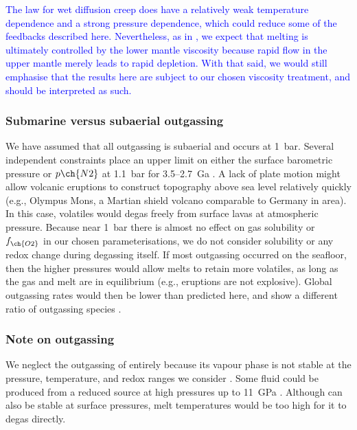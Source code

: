 \documentclass[3p,authoryear]{elsarticle}
\newcommand{\editthree}[2]{\textcolor{blue}{\sout{#1}#2}}
\begin{document}
\editthree{}{The \citet{Karato1993} law for wet diffusion creep does have a relatively weak temperature dependence and a strong pressure dependence, which could reduce some of the feedbacks described here. Nevertheless, as in \citet{dorn2018outgassing}, we expect that melting is ultimately controlled by the lower mantle viscosity because rapid flow in the upper mantle merely leads to rapid depletion. With that said, we would still emphasise that the results here are subject to our chosen viscosity treatment, and should be interpreted as such.}


\subsubsection{Submarine versus subaerial outgassing}

We have assumed that all outgassing is subaerial and occurs at 1~bar. Several independent constraints place an upper limit on either the surface barometric pressure or $p\ch{N2}$ at 1.1~bar for 3.5--2.7~Ga \citep{Marty2013, Catling2020}. A lack of plate motion might allow volcanic eruptions to construct topography above sea level relatively quickly (e.g., Olympus Mons, a Martian shield volcano comparable to Germany in area). In this case, volatiles would degas freely from surface lavas at atmospheric pressure. Because near 1~bar there is almost no effect on gas solubility or $f_{\ch{O2}}$ in our chosen parameterisations, we do not consider solubility or any redox change during degassing itself. If most outgassing occurred on the seafloor, then the higher pressures would allow melts to retain more volatiles, as long as the gas and melt are in equilibrium (e.g., eruptions are not explosive). Global outgassing rates would then be lower than predicted here, and show a different ratio of outgassing species \citep{Gaillard2011}.


\subsubsection{Note on  outgassing}

We neglect the outgassing of  entirely because its vapour phase is not stable at the pressure, temperature, and redox ranges we consider \citep{zhang2009model, wetzel2013degassing, ramirez2014warming}. Some  fluid could be produced from a reduced source at high pressures up to 11~GPa \citep{Scott2004}. Although  can also be stable at surface pressures, melt temperatures would be too high for it to degas directly.
\end{document}
